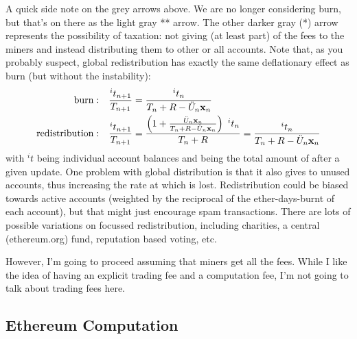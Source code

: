 \documentclass[10pt,a4paper]{article}
\begin{document}
A quick side note on the grey arrows above. We are no longer considering \ether burn, but that's on there as the light gray ** arrow. The other darker gray (*) arrow represents the possibility of taxation: \ie not giving (at least part) of the fees to the miners and instead distributing them to other or all accounts. Note that, as you probably suspect, global redistribution has exactly the same deflationary effect as \ether burn (but without the instability):
\begin{align}
\mathrm{burn:}&\quad \frac{^it_{n+1}}{{T}_{n+1}} = \frac{^it_n}{{T}_n + {R} - {\ddot{U}}_n{\mathbf x}_n} \\
\mathrm{redistribution:}&\quad \frac{^it_{n+1}}{{T}_{n+1}} = \frac{\left(1 + \frac{{\ddot{U}}_n{\mathbf x}_n}{{T}_n + R - {\ddot{U}}_n{\mathbf x}_n}\right)\ ^it_n}{{T}_n + {R}} = \frac{ ^it_n}{{T}_n + R - {\ddot{U}}_n{\mathbf x}_n} 
\end{align}
with $^it$ being individual account balances and \T being the total amount of \ether after a given update. One problem with global distribution is that it also gives \ether to unused accounts, thus increasing the rate at which \ether is lost. Redistribution could be biased towards active accounts (\eg weighted by the reciprocal of the ether-days-burnt of each account), but that might just encourage spam transactions. There are lots of possible variations on focussed redistribution, including charities, a central (ethereum.org) fund, reputation based voting, etc. 

However, I'm going to proceed assuming that miners get all the fees. While I like the idea of having an explicit trading fee and a computation fee, I'm not going to talk about trading fees here.

\subsection*{Ethereum Computation}
\end{document}

